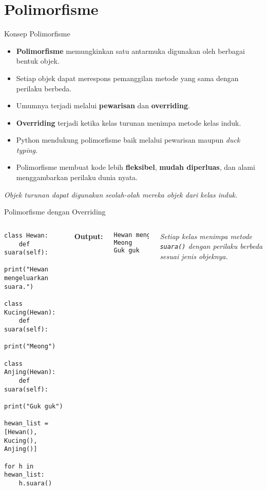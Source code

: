 \documentclass[aspectratio=169, table]{beamer}
\begin{document}
\section{Polimorfisme}

\begin{frame}[fragile]{Konsep Polimorfisme}
\vspace{20pt}
\begin{itemize}
    \item \textbf{Polimorfisme} memungkinkan satu antarmuka digunakan oleh berbagai bentuk objek.
    \item Setiap objek dapat merespons pemanggilan metode yang sama dengan perilaku berbeda.
    \item Umumnya terjadi melalui \textbf{pewarisan} dan \textbf{overriding}.
    \item \textbf{Overriding} terjadi ketika kelas turunan menimpa metode kelas induk.
    \item Python mendukung polimorfisme baik melalui pewarisan maupun \emph{duck typing}.
    \item Polimorfisme membuat kode lebih \textbf{fleksibel}, \textbf{mudah diperluas}, dan alami menggambarkan perilaku dunia nyata.
\end{itemize}

\begin{center}
\textit{Objek turunan dapat digunakan seolah-olah mereka objek dari kelas induk.}
\end{center}
\end{frame}


\begin{frame}[fragile]{Polimorfisme dengan Overriding}
\vspace{20pt}
\begin{columns}[T,totalwidth=0.95\textwidth]
\begin{lstlisting}[style=PythonStyle]
class Hewan:
    def suara(self):
        print("Hewan mengeluarkan suara.")

class Kucing(Hewan):
    def suara(self):
        print("Meong")

class Anjing(Hewan):
    def suara(self):
        print("Guk guk")

hewan_list = [Hewan(), Kucing(), Anjing()]

for h in hewan_list:
    h.suara()
\end{lstlisting}

\textbf{Output:}
\begin{lstlisting}[language=bash]
Hewan mengeluarkan suara.
Meong
Guk guk
\end{lstlisting}

\textit{Setiap kelas menimpa metode \texttt{suara()} 
dengan perilaku berbeda sesuai jenis objeknya.}
\end{columns}
\end{frame}
\end{document}
